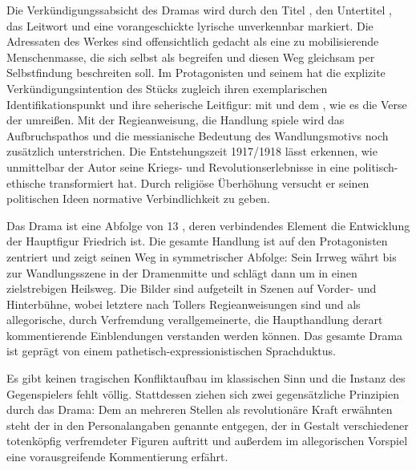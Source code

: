 Die Verkündigungssabsicht des Dramas wird durch den Titel \Cite{Die
  Wandlung}, den Untertitel \Cite{Das Ringen eines Menschen}, das Leitwort
\Cite{Ihr seid der Weg} und eine vorangeschickte lyrische
\Cite{Aufrüttelung} unverkennbar markiert. Die Adressaten des Werkes sind
offensichtlich gedacht als eine zu mobilisierende Menschenmasse, die sich
selbst als \Cite{Weg} begreifen und diesen Weg gleichsam per Selbstfindung
beschreiten soll. Im Protagonisten und seinem \Cite{Ringen} hat die
explizite Verkündigungsintention des Stücks zugleich ihren exemplarischen
Identifikationspunkt und ihre seherische Leitfigur: \Cite{einen Bruder} mit
\Cite{dem großen Wissen} und dem \Cite{großem Willen}, wie es die Verse der
\Cite{Aufrüttelung} umreißen. Mit der Regieanweisung, die Handlung spiele
\Cite{in Europa vor Anbruch der Wiedergeburt} wird das Aufbruchs\-pathos und
die messianische Bedeutung des Wandlungsmotivs noch zusätzlich
unterstrichen. Die Entstehungszeit 1917/1918 lässt erkennen, wie unmittelbar
der Autor seine Kriegs- und Revolutionserlebnisse in eine politisch-ethische
 transformiert hat. Durch religiöse
Überhöhung versucht er seinen politischen Ideen normative Verbindlichkeit zu
geben.

Das Drama ist eine Abfolge von 13 \Cite{Bildern}, deren verbindendes Element die
Entwicklung der Hauptfigur Friedrich ist.  
Die gesamte Handlung ist auf den Protagonisten zentriert und zeigt seinen Weg
in symmetrischer Abfolge:
Sein Irrweg währt bis zur Wandlungsszene in der Dramenmitte und schlägt dann um
in einen zielstrebigen Heilsweg.  Die Bilder sind aufgeteilt in Szenen auf Vorder-
und Hinterbühne, wobei letztere nach Tollers Regieanweisungen \Cite{in
  innerlicher Traumferne gespielt zu denken} sind und als allegorische, durch
Verfremdung verallgemeinerte, die Haupthandlung derart kommentierende
Einblendungen verstanden werden können.  Das gesamte Drama ist geprägt von
einem pathetisch-expressionistischen Sprachduktus.

Es gibt keinen tragischen Konfliktaufbau im klassischen Sinn und die Instanz
des Gegenspielers fehlt völlig. Stattdessen ziehen sich zwei gegensätzliche
Prinzipien durch das Drama: Dem an mehreren Stellen als revolutionäre Kraft
erwähnten \Cite{Geist} steht der in den
Personalangaben genannte \Cite{Tod als Feind des Geistes} entgegen, der in
Gestalt verschiedener totenköpfig verfremdeter Figuren auftritt und außerdem
im allegorischen Vorspiel \Cite{Die Totenkaserne} 
eine vorausgreifende
Kommentierung erfährt.

